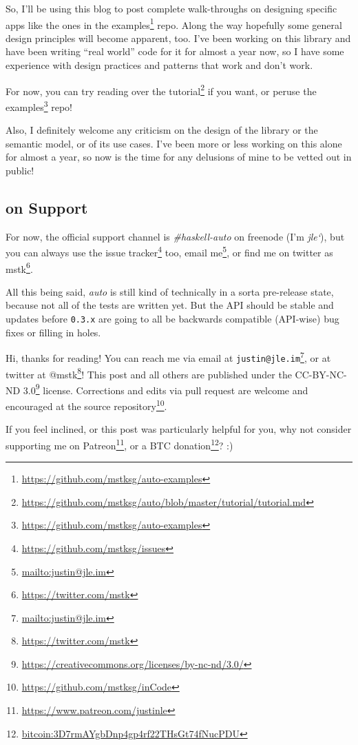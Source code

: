\documentclass[]{article}
\renewcommand{\href}[2]{#2\footnote{\url{#1}}}
\begin{document}
So, I'll be using this blog to post complete walk-throughs on designing specific
apps like the ones in the
\href{https://github.com/mstksg/auto-examples}{examples} repo. Along the way
hopefully some general design principles will become apparent, too. I've been
working on this library and have been writing ``real world'' code for it for
almost a year now, so I have some experience with design practices and patterns
that work and don't work.

For now, you can try reading over the
\href{https://github.com/mstksg/auto/blob/master/tutorial/tutorial.md}{tutorial}
if you want, or peruse the
\href{https://github.com/mstksg/auto-examples}{examples} repo!

Also, I definitely welcome any criticism on the design of the library or the
semantic model, or of its use cases. I've been more or less working on this
alone for almost a year, so now is the time for any delusions of mine to be
vetted out in public!

\hypertarget{on-support}{%
\subsection{on Support}\label{on-support}}

For now, the official support channel is \emph{\#haskell-auto} on freenode (I'm
\emph{jle`}), but you can always use the
\href{https://github.com/mstksg/issues}{issue tracker} too,
\href{mailto:justin@jle.im}{email me}, or find me on twitter as
\href{https://twitter.com/mstk}{mstk}.

All this being said, \emph{auto} is still kind of technically in a sorta
pre-release state, because not all of the tests are written yet. But the API
should be stable and updates before \texttt{0.3.x} are going to all be backwards
compatible (API-wise) bug fixes or filling in holes.

Hi, thanks for reading! You can reach me via email at
\href{mailto:justin@jle.im}{\nolinkurl{justin@jle.im}}, or at twitter at
\href{https://twitter.com/mstk}{@mstk}! This post and all others are published
under the \href{https://creativecommons.org/licenses/by-nc-nd/3.0/}{CC-BY-NC-ND
3.0} license. Corrections and edits via pull request are welcome and encouraged
at \href{https://github.com/mstksg/inCode}{the source repository}.

If you feel inclined, or this post was particularly helpful for you, why not
consider \href{https://www.patreon.com/justinle}{supporting me on Patreon}, or a
\href{bitcoin:3D7rmAYgbDnp4gp4rf22THsGt74fNucPDU}{BTC donation}? :)
\end{document}
